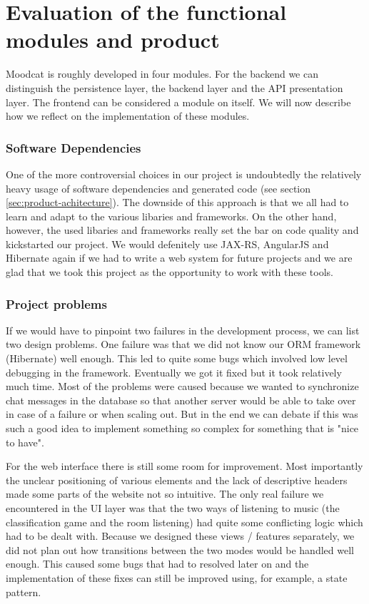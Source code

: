 
\chapter{Evaluation of the functional modules and product}

Moodcat is roughly developed in four modules.
For the backend we can distinguish the persistence layer, the backend layer and the API presentation layer.
The frontend can be considered a module on itself.
We will now describe how we reflect on the implementation of these modules.

\subsection{Software Dependencies}
One of the more controversial choices in our project is undoubtedly the relatively heavy usage of software dependencies and generated code (see section \ref{sec:product-achitecture}).
The downside of this approach is that we all had to learn and adapt to the various libaries and frameworks.
On the other hand, however, the used libaries and frameworks really set the bar on code quality and kickstarted our project.
We would defenitely use JAX-RS, AngularJS and Hibernate again if we had to write a web system for future projects and we are glad that we took this project as the opportunity to work with these tools.

\subsection{Project problems}
If we would have to pinpoint two failures in the development process, we can list two design problems.
One failure was that we did not know our ORM framework (Hibernate) well enough.
This led to quite some bugs which involved low level debugging in the framework.
Eventually we got it fixed but it took relatively much time.
Most of the problems were caused because we wanted to synchronize chat messages in the database so that another server would be able to take over in case of a failure or when scaling out.
But in the end we can debate if this was such a good idea to implement something so complex for something that is "nice to have".

For the web interface there is still some room for improvement.
Most importantly the unclear positioning of various elements and the lack of descriptive headers made some parts of the website not so intuitive.
The only real failure we encountered in the UI layer was that the two ways of listening to music (the classification game and the room listening) had quite some conflicting logic which had to be dealt with.
Because we designed these views / features separately, we did not plan out how transitions between the two modes would be handled well enough.
This caused some bugs that had to resolved later on and the implementation of these fixes can still be improved using, for example, a state pattern.

